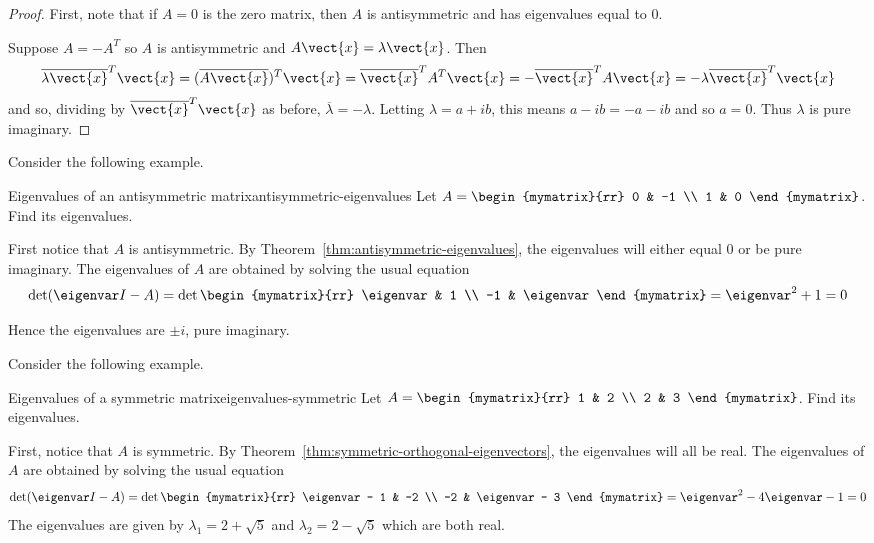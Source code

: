 \begin{proof}
First, note that if $A=0$ is the zero matrix, then $A$ is antisymmetric and has eigenvalues equal to $0$.

Suppose $A=-A^{T}$ so $A$ is antisymmetric and $A\vect{x}=\lambda
\vect{x}$. Then
\begin{equation*}
\overline{\lambda \vect{x}}^{T}\vect{x}=(\overline{A
\vect{x}}) ^{T}\vect{x}=\overline{\vect{x}}^{T}A^{T}\vect{x}=-
\overline{\vect{x}}^{T}A\vect{x}=-\lambda \overline{\vect{x}}^{T}
\vect{x}
\end{equation*}
and so, dividing by $\overline{\vect{x}}^{T}\vect{x}$ as before, $
\overline{\lambda }=-\lambda$. Letting $\lambda =a+ib$, this means $
a-ib=-a-ib$ and so $a=0$. Thus $\lambda $ is pure imaginary.
\end{proof}

Consider the following example.

\begin{example}{Eigenvalues of an antisymmetric matrix}{antisymmetric-eigenvalues}
Let $A=\begin{mymatrix}{rr}
0 & -1 \\
1 & 0
\end{mymatrix}$.  Find its eigenvalues.
\end{example}

\begin{solution}
First notice that $A$ is antisymmetric. By Theorem~\ref{thm:antisymmetric-eigenvalues}, the eigenvalues will either equal $0$ or be pure imaginary.  The eigenvalues of $A$ are obtained by solving the usual equation
\[
\det (\eigenvar I - A ) =
\det \begin{mymatrix}{rr}
\eigenvar & 1 \\
-1 & \eigenvar
\end{mymatrix} =\eigenvar ^{2}+1=0
\]

Hence the eigenvalues are $\pm i$, pure
imaginary.
\end{solution}

Consider the following example.

\begin{example}{Eigenvalues of a symmetric matrix}{eigenvalues-symmetric}
Let $A=\begin{mymatrix}{rr}
1 & 2 \\
2 & 3
\end{mymatrix}$. Find its eigenvalues.
\end{example}

\begin{solution}
First, notice that $A$ is symmetric. By Theorem~\ref{thm:symmetric-orthogonal-eigenvectors}, the eigenvalues will all be real. The eigenvalues of $A$ are obtained by solving the usual equation
\[
\det (\eigenvar I - A) =
\det \begin{mymatrix}{rr}
\eigenvar - 1 & -2 \\
-2 & \eigenvar - 3
\end{mymatrix} = \eigenvar^2 -4\eigenvar -1=0
\]
The eigenvalues are given by $\lambda_1 =2+
\sqrt{5}$ and $\lambda_2 =2-\sqrt{5}$ which are both real.
\end{solution}

